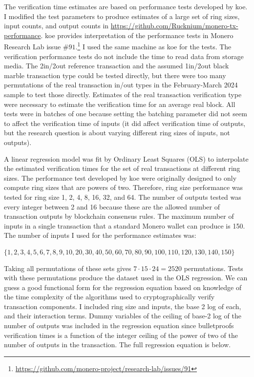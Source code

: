 \documentclass[english]{article}
\begin{document}
The verification time estimates are based on performance tests developed
by koe. I modified the test parameters to produce estimates of a large
set of ring sizes, input counts, and output counts in \url{https://github.com/Rucknium/monero-tx-performance}.
koe provides interpretation of the performance tests in Monero Research
Lab issue $\#91$.\footnote{\url{https://github.com/monero-project/research-lab/issues/91}}
I used the same machine as koe for the tests. The verification performance
tests do not include the time to read data from storage media. The
2in/2out reference transaction and the assumed 1in/2out black marble
transaction type could be tested directly, but there were too many
permutations of the real transaction in/out types in the February-March
2024 sample to test those directly. Estimates of the real transaction
verification type were necessary to estimate the verification time
for an average real block. All tests were in batches of one because
setting the batching parameter did not seem to affect the verification
time of inputs (it did affect verification time of outputs, but the
research question is about varying different ring sizes of inputs,
not outputs).

A linear regression model was fit by Ordinary Least Squares (OLS)
to interpolate the estimated verification times for the set of real
transactions at different ring sizes. The performance test developed
by koe were originally designed to only compute ring sizes that are
powers of two. Therefore, ring size performance was tested for ring
size 1, 2, 4, 8, 16, 32, and 64. The number of outputs tested was
every integer between 2 and 16 because these are the allowed number
of transaction outputs by blockchain consensus rules. The maximum
number of inputs in a single transaction that a standard Monero wallet
can produce is 150. The number of inputs I used for the performance
estimates was:

$\{1,2,3,4,5,6,7,8,9,10,20,30,40,50,60,70,80,90,100,110,120,130,140,150\}$

Taking all permutations of these sets gives $7\cdot15\cdot24=2520$
permutations. Tests with these permutations produce the dataset used
in the OLS regression. We can guess a good functional form for the
regression equation based on knowledge of the time complexity of the
algorithms used to cryptographically verify transaction components.
I included ring size and inputs, the base 2 log of each, and their
interaction terms. Dummy variables of the ceiling of base-2 log of
the number of outputs was included in the regression equation since
bulletproofs verification times is a function of the integer ceiling
of the power of two of the number of outputs in the transaction. The
full regression equation is below.
\end{document}
